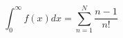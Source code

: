 \documentclass[12pt]{article}
\begin{document}
\begin{equation}
	\int_{0}^\infty f(x) dx = \sum_{n=1}^N \frac{n-1}{n!}
\end{equation}
\end{document}

